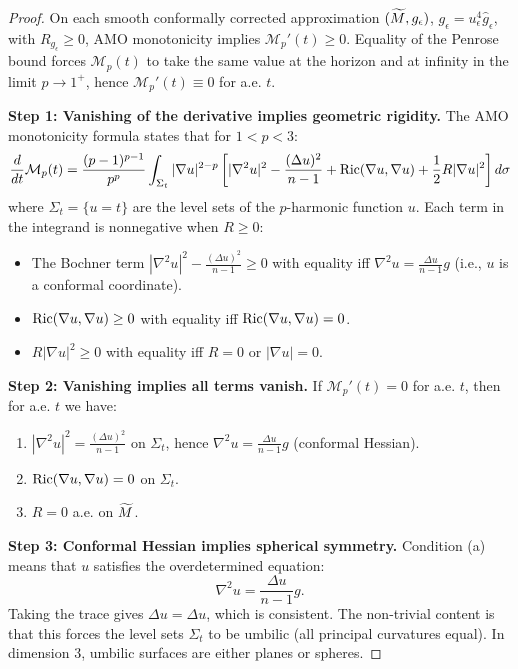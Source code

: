 \begin{proof}
On each smooth conformally corrected approximation $(\widetilde{M},g_\epsilon)$, $g_\epsilon=u_\epsilon^4\hat g_\epsilon$, with $R_{g_\epsilon}\ge 0$, AMO monotonicity implies $\mathcal{M}_p'(t)\ge 0$. Equality of the Penrose bound forces $\mathcal{M}_p(t)$ to take the same value at the horizon and at infinity in the limit $p\to 1^+$, hence $\mathcal{M}_p'(t)\equiv 0$ for a.e. $t$.

\textbf{Step 1: Vanishing of the derivative implies geometric rigidity.}
The AMO monotonicity formula states that for $1 < p < 3$:
\[
    \frac{d}{dt}\mathcal{M}_p(t) = \frac{(p-1)^{p-1}}{p^p} \int_{\Sigma_t} |\nabla u|^{2-p} \left[ |\nabla^2 u|^2 - \frac{(\Delta u)^2}{n-1} + \mathrm{Ric}(\nabla u, \nabla u) + \frac{1}{2}R|\nabla u|^2 \right] d\sigma
\]
where $\Sigma_t = \{u = t\}$ are the level sets of the $p$-harmonic function $u$. Each term in the integrand is nonnegative when $R \ge 0$:
\begin{itemize}
    \item The Bochner term $|\nabla^2 u|^2 - \frac{(\Delta u)^2}{n-1} \ge 0$ with equality iff $\nabla^2 u = \frac{\Delta u}{n-1} g$ (i.e., $u$ is a conformal coordinate).
    \item $\mathrm{Ric}(\nabla u, \nabla u) \ge 0$ with equality iff $\mathrm{Ric}(\nabla u, \nabla u) = 0$.
    \item $R|\nabla u|^2 \ge 0$ with equality iff $R = 0$ or $|\nabla u| = 0$.
\end{itemize}

\textbf{Step 2: Vanishing implies all terms vanish.}
If $\mathcal{M}_p'(t) = 0$ for a.e. $t$, then for a.e. $t$ we have:
\begin{enumerate}
    \item[(a)] $|\nabla^2 u|^2 = \frac{(\Delta u)^2}{n-1}$ on $\Sigma_t$, hence $\nabla^2 u = \frac{\Delta u}{n-1} g$ (conformal Hessian).
    \item[(b)] $\mathrm{Ric}(\nabla u, \nabla u) = 0$ on $\Sigma_t$.
    \item[(c)] $R = 0$ a.e. on $\widetilde{M}$.
\end{enumerate}

\textbf{Step 3: Conformal Hessian implies spherical symmetry.}
Condition (a) means that $u$ satisfies the overdetermined equation:
\[
    \nabla^2 u = \frac{\Delta u}{n-1} g.
\]
Taking the trace gives $\Delta u = \Delta u$, which is consistent. The non-trivial content is that this forces the level sets $\Sigma_t$ to be umbilic (all principal curvatures equal). In dimension 3, umbilic surfaces are either planes or spheres.


\end{proof}
